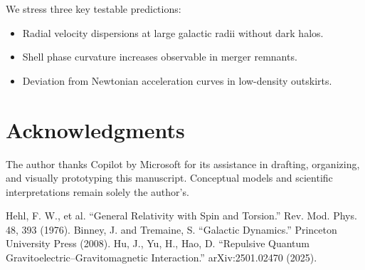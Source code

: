 \documentclass[11pt]{article}
\begin{document}
We stress three key testable predictions:
\begin{itemize}
\item Radial velocity dispersions at large galactic radii without dark halos.
\item Shell phase curvature increases observable in merger remnants.
\item Deviation from Newtonian acceleration curves in low-density outskirts.
\end{itemize}

\section*{Acknowledgments}
The author thanks Copilot by Microsoft for its assistance in drafting, organizing, and visually prototyping this manuscript. Conceptual models and scientific interpretations remain solely the author’s.


\begin{thebibliography}{99}
 Hehl, F. W., et al. “General Relativity with Spin and Torsion.” Rev. Mod. Phys. 48, 393 (1976).
 Binney, J. and Tremaine, S. “Galactic Dynamics.” Princeton University Press (2008).
 Hu, J., Yu, H., Hao, D. “Repulsive Quantum Gravitoelectric–Gravitomagnetic Interaction.” arXiv:2501.02470 (2025).
\end{thebibliography}
\end{document}
